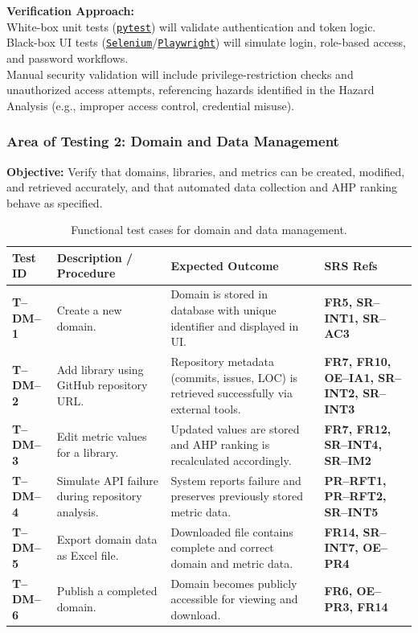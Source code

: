 \documentclass[12pt, titlepage]{article}
\begin{document}
\noindent\textbf{Verification Approach:}\\
White-box unit tests (\texttt{\href{https://requests-mock.readthedocs.io/en/latest/overview.html}{pytest}}) will validate authentication and token logic.\\
Black-box UI tests (\texttt{\href{https://www.selenium.dev/}{Selenium}}/\texttt{\href{https://playwright.dev/}{Playwright}}) will simulate login, role-based access, and password workflows.\\
Manual security validation will include privilege-restriction checks and unauthorized access attempts, referencing hazards identified in the Hazard Analysis (e.g., improper access control, credential misuse).\\[0.5em]


\subsubsection{Area of Testing 2: Domain and Data Management}
\textbf{Objective:} Verify that domains, libraries, and metrics can be created, modified, and retrieved accurately, and that automated data collection and AHP ranking behave as specified.

\begin{table}[H]
\centering
\begin{tabularx}{\textwidth}{|l|X|X|X|}
\hline
\textbf{Test ID} & \textbf{Description / Procedure} & \textbf{Expected Outcome} & \textbf{SRS Refs} \\
\hline

\textbf{T--DM--1} &
Create a new domain. &
Domain is stored in database with unique identifier and displayed in UI. &
\textbf{FR5, SR--INT1, SR--AC3} \\
\hline

\textbf{T--DM--2} &
Add library using GitHub repository URL. &
Repository metadata (commits, issues, LOC) is retrieved successfully via external tools. &
\textbf{FR7, FR10, OE--IA1, SR--INT2, SR--INT3} \\
\hline

\textbf{T--DM--3} &
Edit metric values for a library. &
Updated values are stored and AHP ranking is recalculated accordingly. &
\textbf{FR7, FR12, SR--INT4, SR--IM2} \\
\hline

\textbf{T--DM--4} &
Simulate API failure during repository analysis. &
System reports failure and preserves previously stored metric data. &
\textbf{PR--RFT1, PR--RFT2, SR--INT5} \\
\hline

\textbf{T--DM--5} &
Export domain data as Excel file. &
Downloaded file contains complete and correct domain and metric data. &
\textbf{FR14, SR--INT7, OE--PR4} \\
\hline

\textbf{T--DM--6} &
Publish a completed domain. &
Domain becomes publicly accessible for viewing and download. &
\textbf{FR6, OE--PR3, FR14} \\
\hline

\end{tabularx}
\caption{Functional test cases for domain and data management.}
\end{table}
\end{document}
